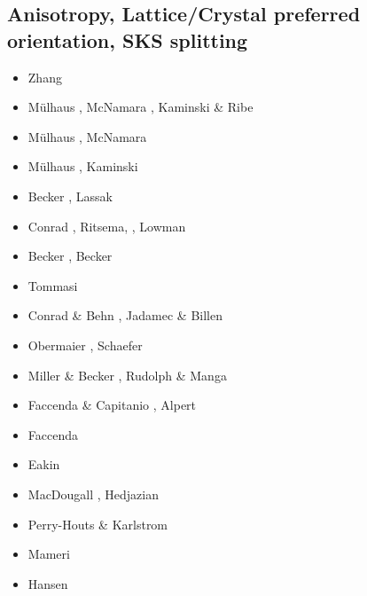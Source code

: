 \subsection{Anisotropy, Lattice/Crystal preferred orientation, SKS splitting}
\label{sec:topics:anisotropy}

\begin{scriptsize}
\begin{itemize}
\item[\nineteeneightythree] Zhang \etal \cite{zhhj93}
\item[\twothousandtwo] M\"ulhaus \etal \cite{mudm02}, McNamara \etal \cite{mcvk02}, 
                       Kaminski \& Ribe \cite{kari02}
\item[\twothousandthree] M\"ulhaus \etal \cite{mumc03}, McNamara \etal \cite{mcvk03}
\item[\twothousandfour] M\"ulhaus \etal \cite{mumc04}, Kaminski \etal \cite{karb04}
\item[\twothousandsix] Becker \etal \cite{besb06}, Lassak \etal \cite{lafh06}
\item[\twothousandseven] Conrad \etal \cite{cobs07}, Ritsema, \etal \cite{rimb07}, Lowman \etal \cite{lopk07}
\item[\twothousandeight] Becker \etal \cite{beke08}, Becker \cite{beck08}
\item[\twothousandnine] Tommasi \etal \cite{tokv09}
\item[\twothousandten] Conrad \& Behn \cite{cobe10}, Jadamec \& Billen \cite{jabi10a}
\item[\twothousandeleven] Obermaier \etal \cite{obbh11}, Schaefer \etal \cite{scbb11}
\item[\twothousandtwelve] Miller \& Becker \cite{mibe12}, Rudolph \& Manga \cite{ruma12}
\item[\twothousandthirteen] Faccenda \& Capitanio \cite{faca13}, Alpert \etal \cite{almb13}
\item[\twothousandfourteen] Faccenda \cite{facc14}
\item[\twothousandfifteen] Eakin \etal \cite{ealw15}
\item[\twothousandseventeen] MacDougall \etal \cite{majf17}, Hedjazian \etal \cite{hegd17}
\item[\twothousandeighteen] Perry-Houts \& Karlstrom \cite{peka18}
\item[\twothousandnineteen] Mameri \etal \cite{mats19}
\item[\twothousandtwentyone] Hansen \etal \cite{hafw21}
\end{itemize}
\end{scriptsize}

